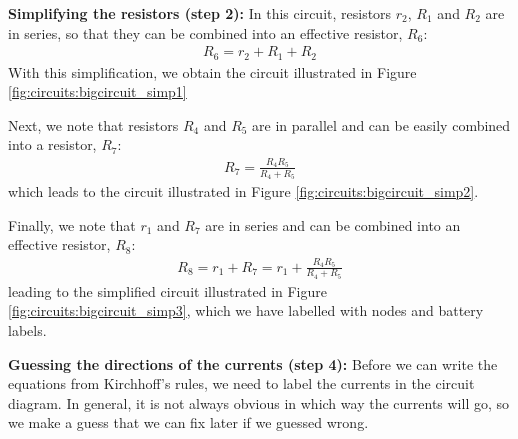 \textbf{Simplifying the resistors (step 2):} In this circuit, resistors $r_2$, $R_1$ and $R_2$ are in series, so that they can be combined into an effective resistor, $R_6$:
\begin{align*}
R_6=r_2+R_1+R_2
\end{align*}
With this simplification, we obtain the circuit illustrated in Figure \ref{fig:circuits:bigcircuit_simp1}


Next, we note that resistors $R_4$ and $R_5$ are in parallel and can be easily combined into a resistor, $R_7$:
\begin{align*}
R_7=\frac{R_4R_5}{R_4+R_5}
\end{align*}
which leads to the circuit illustrated in Figure \ref{fig:circuits:bigcircuit_simp2}.


Finally, we note that $r_1$ and $R_7$ are in series and can be combined into an effective resistor, $R_8$:
\begin{align*}
R_8=r_1+R_7=r_1+\frac{R_4R_5}{R_4+R_5}
\end{align*}
leading to the simplified circuit illustrated in Figure \ref{fig:circuits:bigcircuit_simp3}, which we have labelled with nodes and battery labels. 


\textbf{Guessing the directions of the currents (step 4): }Before we can write the equations from Kirchhoff's rules, we need to label the currents in the circuit diagram. In general, it is not always obvious in which way the currents will go, so we make a guess that we can fix later if we guessed wrong. 

